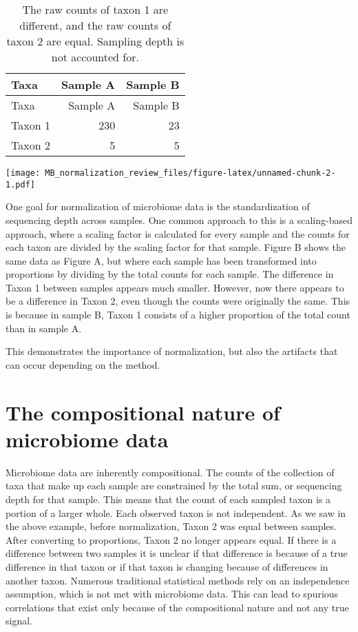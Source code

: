 \documentclass[
]{book}
\begin{document}
\begin{longtable}[]{@{}lrr@{}}
\caption{\label{tab:unnamed-chunk-1}The raw counts of taxon 1 are different, and the raw counts of taxon 2 are equal. Sampling depth is not accounted for.}\tabularnewline
\toprule
Taxa & Sample A & Sample B\tabularnewline
\midrule
\endfirsthead
\toprule
Taxa & Sample A & Sample B\tabularnewline
\midrule
\endhead
Taxon 1 & 230 & 23\tabularnewline
Taxon 2 & 5 & 5\tabularnewline
\bottomrule
\end{longtable}

\texttt{[image: MB\_normalization\_review\_files/figure-latex/unnamed-chunk-2-1.pdf]}

One goal for normalization of microbiome data is the standardization of sequencing depth across samples. One common approach to this is a scaling-based approach, where a scaling factor is calculated for every sample and the counts for each taxon are divided by the scaling factor for that sample. Figure B shows the same data as Figure A, but where each sample has been transformed into proportions by dividing by the total counts for each sample. The difference in Taxon 1 between samples appears much smaller. However, now there appears to be a difference in Taxon 2, even though the counts were originally the same. This is because in sample B, Taxon 1 consists of a higher proportion of the total count than in sample A.

This demonstrates the importance of normalization, but also the artifacts that can occur depending on the method.

\hypertarget{the-compositional-nature-of-microbiome-data}{%
\section{The compositional nature of microbiome data}\label{the-compositional-nature-of-microbiome-data}}

Microbiome data are inherently compositional. The counts of the collection of taxa that make up each sample are constrained by the total sum, or sequencing depth for that sample. This means that the count of each sampled taxon is a portion of a larger whole. Each observed taxon is not independent. As we saw in the above example, before normalization, Taxon 2 was equal between samples. After converting to proportions, Taxon 2 no longer appears equal. If there is a difference between two samples it is unclear if that difference is because of a true difference in that taxon or if that taxon is changing because of differences in another taxon. Numerous traditional statistical methods rely on an independence assumption, which is not met with microbiome data. This can lead to spurious correlations that exist only because of the compositional nature and not any true signal.
\end{document}
